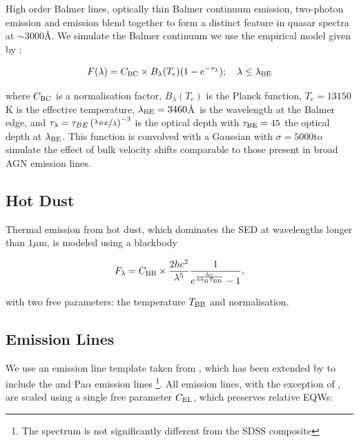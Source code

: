 High order Balmer lines, optically thin Balmer continuum emission, two-photon emission and  emission blend together to form a distinct feature in quasar spectra at $\sim3000$\AA. 
We simulate the Balmer continuum we use the empirical model given by \citet{grandi82}: 

\begin{equation}
  F(\lambda) = C_{\rm BC} \times B_\lambda(T_e)(1-e^{-\tau_\lambda}); \quad \lambda \leq \lambda_{\rm BE}
\end{equation}

where $C_{\rm BC}$ is a normalisation factor, $B_\lambda(T_e)$ is the Planck function, $T_e=13150$K is the effective temperature, $\lambda_{\rm BE}=3460$\AA\, is the wavelength at the Balmer edge, and $\tau_\lambda = \tau_{BE}\left( \nicefrac{\lambda_{BE}} {\lambda} \right)^{-3}$ is the optical depth with $\tau_{\rm BE}=45$ the optical depth at $\lambda_{\rm BE}$. 
This function is convolved with a Gaussian with $\sigma=5000$\kms to simulate the effect of bulk velocity shifts comparable to those present in broad AGN emission lines. 

\subsection{Hot Dust}

Thermal emission from hot dust, which dominates the SED at wavelengths longer than $1\mu$m, is modeled using a blackbody

\begin{eqnarray}  
  F_\lambda = C_{\rm BB} \times \frac{2 hc^2}{\lambda^5}\frac{1}{ e^{\frac{hc}{\lambda k_\mathrm{B}T_{\rm BB}}} - 1}, 
\end{eqnarray}

with two free parameters: the temperature $T_{\rm BB}$ and normalisation. 

\subsection{Emission Lines}

We use an emission line template taken from \citet{francis91}, which has been extended by \citet{maddox06} to include the \hans and Pa$\alpha$ emission lines \footnote{The spectrum is not significantly different from the \citet{vandenberk01} SDSS composite}. 
All emission lines, with the exception of \hans, are scaled using a single free parameter $C_{\rm EL}$, which preserves relative EQWs:

